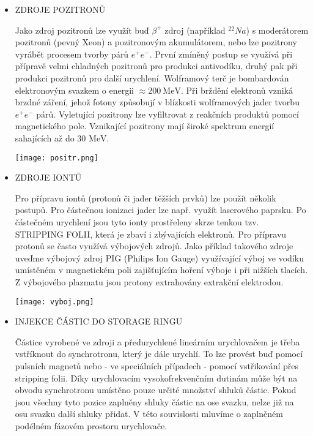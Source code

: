 \documentclass[../../main.tex]{subfiles}
\begin{document}
\begin{itemize}
	\item ZDROJE POZITRONŮ
	
	Jako zdroj pozitronů lze využít buď $\beta^+$ zdroj (například $^{22}Na$) s moderátorem pozitronů (pevný Xeon) a pozitronovým akumulátorem, nebo lze pozitrony vyrábět procesem tvorby párů $e^+ e^-$. První zmíněný postup se využívá při přípravě velmi chladných pozitronů pro produkci antivodíku, druhý pak při produkci pozitronů pro další urychlení. Wolframový terč je bombardován elektronovým svazkem o energii  $\approx 200 ~\mathrm{MeV}$. Při brždění elektronů vzniká brzdné záření, jehož fotony způsobují v blízkosti wolframových jader tvorbu $e^+ e^- $ párů. Vyletující pozitrony lze vyfiltrovat z reakčních produktů pomocí magnetického pole. Vznikající pozitrony mají široké spektrum energií sahajících až do 30 $\mathrm{MeV}$.
	
	
	\begin{center}
		\texttt{[image: positr.png]}
	\end{center}
	 
	\item ZDROJE IONTŮ
	
	Pro přípravu iontů (protonů či jader těžších prvků) lze použít několik postupů. Pro částečnou ionizaci jader lze např. využít laserového paprsku. Po částečném urychlení jsou tyto ionty prostřeleny skrze tenkou tzv. STRIPPING FOLII, která je zbaví i zbývajících elektronů. Pro přípravu protonů se často využívá výbojových zdrojů. Jako příklad takového zdroje uveďme výbojový zdroj PIG (Philips Ion Gauge) využívající výboj ve vodíku umístěném v magnetickém poli zajišťujícím hoření výboje i při nižších tlacích. Z výbojového plazmatu jsou protony extrahovány extrakční elektrodou. 
	
	
	\begin{center}
		\texttt{[image: vyboj.png]}
	\end{center}
	
	\item INJEKCE ČÁSTIC DO STORAGE RINGU 
	
	Částice vyrobené ve zdroji a předurychlené lineárním urychlovačem je třeba vstříknout do synchrotronu, který je dále urychlí. To lze provést buď pomocí pulsních magnetů nebo - ve speciálních případech - pomocí vstřikování přes stripping folii. Díky urychlovacím vysokofrekvenčním dutinám může být na obvodu synchrotronu umístěno pouze určité množství shluků částic. Pokud jsou všechny tyto pozice zaplněny shluky částic na ose svazku, nelze již na osu svazku další shluky přidat. V této souvislosti mluvíme o zaplněném podélném fázovém prostoru urychlovače.
	

\end{itemize}
\end{document}
